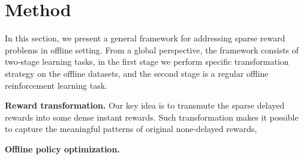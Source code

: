 \section{Method}
In this section, we present a general framework for addressing sparse reward problems in offline setting. From a global perspective, the framework consists of two-stage learning tasks, in the first stage we perform specific transformation strategy on the offline datasets, and the second stage is a regular offline reinforcement learning task.

\textbf{Reward transformation.} Our key idea is to transmute the sparse delayed rewards into some dense instant rewards. Such transformation makes it possible to capture the meaningful patterns of original none-delayed rewards, 


\textbf{Offline policy optimization.}

